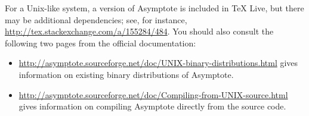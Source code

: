 \documentclass{article}
\providecommand{\phantomsection}{}
\begin{document}
\begin{itemize}[wide]
 For a Unix-like system, a version of 
 Asymptote is included in TeX Live, but there may be additional dependencies;
 see, for instance, \url{http://tex.stackexchange.com/a/155284/484}. You 
 should also consult 
 the following two pages from the official documentation:
 \begin{itemize}
\item \url{http://asymptote.sourceforge.net/doc/UNIX-binary-distributions.html} gives information 
on existing binary distributions of Asymptote.
\item \url{http://asymptote.sourceforge.net/doc/Compiling-from-UNIX-source.html} gives information 
on compiling Asymptote directly from the source code.
 \end{itemize}
 \end{itemize}
 \clearpage
\phantomsection
{}
\printindex
\end{document}
